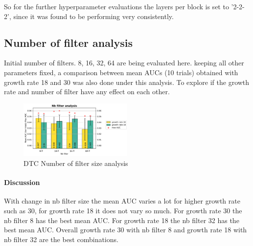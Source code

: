 So for the further hyperparameter evaluations the layers per block is set to '2-2-2', since it was found to be performing very consistently.

\subsection{Number of filter analysis}
Initial number of filters. 8, 16, 32, 64 are being evaluated here. keeping all other parameters fixed, a comparison between mean AUCs (10 trials) obtained with growth rate 18 and 30 was also done under this analysis. 
To explore if the growth rate and number of filter have any effect on each other.

\begin{figure}[ht]
\centering
\includegraphics[width=0.5\textwidth]{images/densenet/simple/densenet_simple_nb_filter}
\caption{DTC Number of filter size analysis}
\label{fig:densenet_simple_nb_filter}
\end{figure}

\paragraph{Discussion\\}
With change in nb filter size the mean AUC varies a lot for higher growth rate such as 30, for growth rate 18 it does not vary so much. For growth rate 30 the nb filter 8 has the best mean AUC. 
For growth rate 18 the nb filter 32 has the best mean AUC. Overall growth rate 30 with nb filter 8 and growth rate 18 with nb filter 32 are the best combinations.


